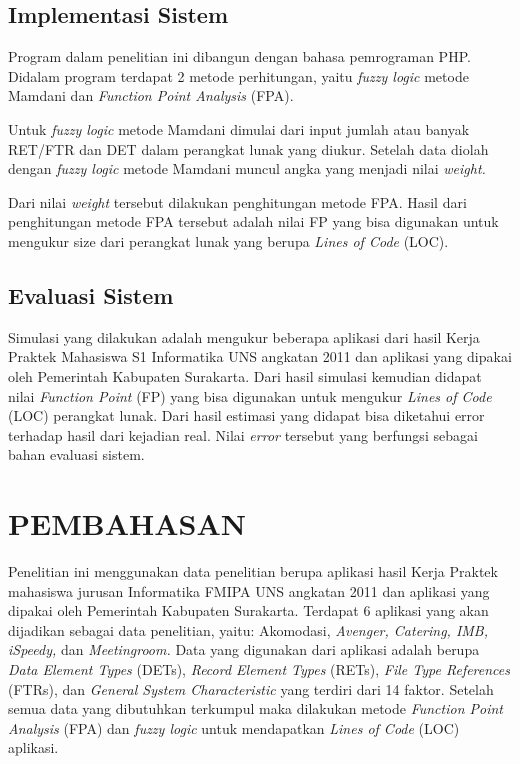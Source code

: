 \documentclass[a4paper]{article}
\begin{document}
\begin{multicols}{2}
\subsection{Implementasi Sistem}

\par Program dalam penelitian ini dibangun dengan bahasa pemrograman PHP. Didalam program terdapat 2 metode perhitungan, yaitu \textit{fuzzy logic} metode Mamdani dan \textit{Function Point Analysis} (FPA).

\par Untuk \textit{fuzzy logic} metode Mamdani dimulai dari input jumlah atau banyak RET/FTR dan DET dalam perangkat lunak yang diukur. Setelah data diolah dengan \textit{fuzzy logic} metode Mamdani muncul angka yang menjadi nilai \textit{weight.}

\par Dari nilai \textit{weight} tersebut dilakukan penghitungan metode FPA. Hasil dari penghitungan metode FPA tersebut adalah nilai FP yang bisa digunakan untuk mengukur size dari perangkat lunak yang berupa \textit{Lines of Code} (LOC).

\subsection{Evaluasi Sistem}

\par Simulasi yang dilakukan adalah mengukur beberapa aplikasi dari hasil Kerja Praktek Mahasiswa S1 Informatika UNS angkatan 2011 dan aplikasi yang dipakai oleh Pemerintah Kabupaten Surakarta. Dari hasil simulasi kemudian didapat nilai \textit{Function Point} (FP) yang bisa digunakan untuk mengukur \textit{Lines of Code} (LOC) perangkat lunak. Dari hasil estimasi yang didapat bisa diketahui error terhadap hasil dari kejadian real. Nilai \textit{error} tersebut yang berfungsi sebagai bahan evaluasi sistem.

\section{PEMBAHASAN}

\par Penelitian ini menggunakan data penelitian berupa aplikasi hasil Kerja Praktek mahasiswa jurusan Informatika FMIPA UNS angkatan 2011 dan aplikasi yang dipakai oleh Pemerintah Kabupaten Surakarta. Terdapat 6 aplikasi yang akan dijadikan sebagai data penelitian, yaitu: Akomodasi, \textit{Avenger, Catering, IMB, iSpeedy,} dan \textit{Meetingroom.} Data yang digunakan dari aplikasi adalah berupa \textit{Data Element Types} (DETs), \textit{Record Element Types} (RETs), \textit{File Type References} (FTRs), dan \textit{General System Characteristic} yang terdiri dari 14 faktor. Setelah semua data yang dibutuhkan terkumpul maka dilakukan metode \textit{Function Point Analysis} (FPA) dan \textit{fuzzy logic} untuk mendapatkan \textit{Lines of Code} (LOC) aplikasi.


\end{multicols}
\end{document}
